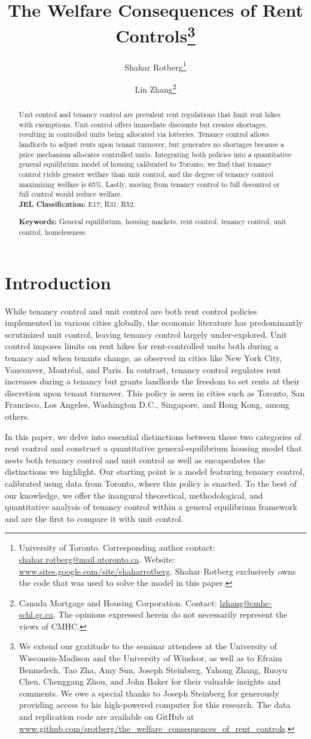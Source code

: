 \documentclass[parskip=full]{article}
\title{\vspace{-1.8cm}The Welfare Consequences of Rent Controls\footnote{We extend our gratitude to the seminar attendees at the University of Wisconsin-Madison and the University of Windsor, as well as to Efraim Benmelech, Tao Zha, Amy Sun, Joseph Steinberg, Yahong Zhang, Ruoyu Chen, Chenggang Zhou, and John Baker for their valuable insights and comments. We owe a special thanks to Joseph Steinberg for generously providing access to his high-powered computer for this research. The data and replication code are available on GitHub at \url{www.github.com/srotberg/the_welfare_consequences_of_rent_controls}.}}
\author{Shahar Rotberg\footnote{University of Toronto. Corresponding author contact: \url{shahar.rotberg@mail.utoronto.ca}. Website: \url{www.sites.google.com/site/shaharrotberg}. Shahar Rotberg exclusively owns the code that was used to solve the model in this paper.} \and Lin Zhang\footnote{Canada Mortgage and Housing Corporation. Contact: \url{lzhang@cmhc-schl.gc.ca}. The opinions expressed herein do not necessarily represent the views of CMHC.}}
\begin{document}
\maketitle

\begin{abstract}
\onehalfspacing
\noindent

\noindent Unit control and tenancy control are prevalent rent regulations that limit rent hikes with exemptions. Unit control offers immediate discounts but creates shortages, resulting in controlled units being allocated via lotteries. Tenancy control allows landlords to adjust rents upon tenant turnover, but generates no shortages because a price mechanism allocates controlled units. Integrating both policies into a quantitative general equilibrium model of housing calibrated to Toronto, we find that tenancy control yields greater welfare than unit control, and the degree of tenancy control maximizing welfare is 65\%. Lastly, moving from tenancy control to full decontrol or full control would reduce welfare.
\\[1.5ex]

\noindent \textbf{JEL Classification:} E17; R31; R52. 

\noindent \textbf{Keywords:} General equilibrium, housing markets, rent control, tenancy control, unit control, homelessness.
\end{abstract}

\section{Introduction}

While tenancy control and unit control are both rent control policies implemented in various cities globally, the economic literature has predominantly scrutinized unit control, leaving tenancy control largely under-explored. Unit control imposes limits on rent hikes for rent-controlled units both during a tenancy and when tenants change, as observed in cities like New York City, Vancouver, Montréal, and Paris. In contrast, tenancy control regulates rent increases during a tenancy but grants landlords the freedom to set rents at their discretion upon tenant turnover. This policy is seen in cities such as Toronto, San Francisco, Los Angeles, Washington D.C., Singapore, and Hong Kong, among others.

In this paper, we delve into essential distinctions between these two categories of rent control and construct a quantitative general-equilibrium housing model that nests both tenancy control and unit control as well as encapsulates the distinctions we highlight. Our starting point is a model featuring tenancy control, calibrated using data from Toronto, where this policy is enacted. To the best of our knowledge, we offer the inaugural theoretical, methodological, and quantitative analysis of tenancy control within a general equilibrium framework and are the first to compare it with unit control.
\end{document}

